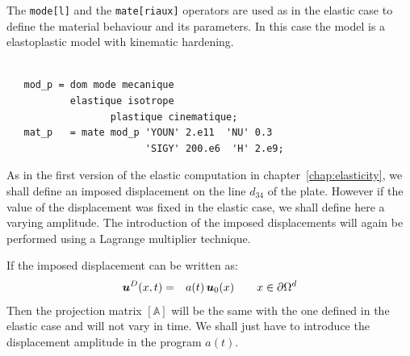 \begin{castemcom}
The \texttt{mode[l]} and the \texttt{mate[riaux]}  operators are used as
in the elastic case to define the material behaviour and its parameters.
In this case the model is a  elastoplastic model 
with  kinematic hardening. 
\end{castemcom}
\begin{castemlines}
\begin{verbatim}

   mod_p = dom mode mecanique
           elastique isotrope
                  plastique cinematique;
   mat_p   = mate mod_p 'YOUN' 2.e11  'NU' 0.3
                        'SIGY' 200.e6  'H' 2.e9;

\end{verbatim}
\end{castemlines}

As in the first version of the elastic computation in 
chapter~\ref{chap:elasticity}, we shall define an imposed 
displacement on the line $d_{34}$ of the plate. However 
if the value of the displacement was fixed in the elastic 
case, we shall define here a varying amplitude. 
The introduction of the imposed displacements will 
again be performed using a Lagrange multiplier technique. 


If the imposed displacement can be written as:
\begin{eqnarray}
  \bm{u}^D(x,t) &=& a(t) \, \bm{u}_0(x)
                      \qquad x \in \partial \Omega^d
\nonumber   
\end{eqnarray}
Then the projection matrix $[\mathbb{A}]$ will be the same with 
the one defined in the elastic case and will 
not vary in time. We shall just have to introduce 
the displacement amplitude in the program $a(t)$. 

